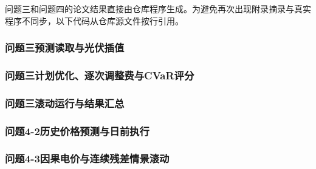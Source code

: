 \documentclass[UTF8,a4paper,12pt]{ctexart}
\begin{document}
问题三和问题四的论文结果直接由仓库程序生成。为避免再次出现附录摘录与真实程序不同步，以下代码从仓库源文件按行引用。

\subsubsection*{问题三预测读取与光伏插值}


\subsubsection*{问题三计划优化、逐次调整费与CVaR评分}


\subsubsection*{问题三滚动运行与结果汇总}


\subsubsection*{问题4-2历史价格预测与日前执行}


\subsubsection*{问题4-3因果电价与连续残差情景滚动}

\end{document}
